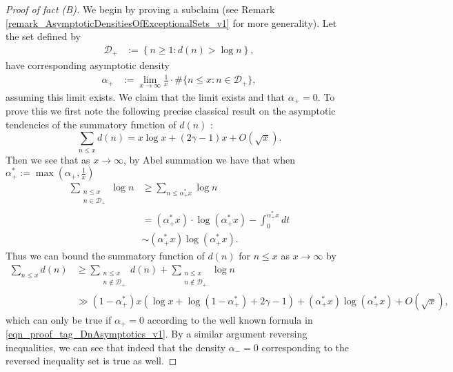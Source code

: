 \documentclass[11pt,reqno,a4letter]{article}
\numberwithin{figure}{section}
\numberwithin{table}{section}
\theoremstyle{plain}
\numberwithin{theorem}{section}
\theoremstyle{definition}
\begin{document}
\begin{proof}[Proof of fact (B)] 
We begin by proving a subclaim 
(see Remark \ref{remark_AsymptoticDensitiesOfExceptionalSets_v1} for more generality). 
Let the set defined by 
\begin{align*} 
\mathcal{D}_{+} & := \left\{n \geq 1: d(n) > \log n\right\}, 
\end{align*} 
have corresponding asymptotic density
\begin{align*} 
\alpha_{+} & := \lim_{x \rightarrow \infty} \frac{1}{x} \cdot \#\{n \leq x: n \in \mathcal{D}_{+}\}, 
\end{align*} 
assuming this limit exists. 
We claim that the limit exists and that $\alpha_{+} = 0$. To prove this we first note the following 
precise classical 
result on the asymptotic tendencies of the summatory function of $d(n)$ \cite[\S 27.11]{NISTHB}: 
\begin{equation} 
\label{eqn_proof_tag_DnAsymptotics_v1} 
\sum_{n \leq x} d(n) = x\log x + (2\gamma-1) x + O(\sqrt{x}). 
\end{equation} 
Then we see that as $x \rightarrow \infty$, by Abel summation we have that when 
$\alpha_{+}^{\ast} := \max\left(\alpha_{+}, \frac{1}{x}\right)$ 
\begin{align*} 
\sum_{\substack{n \leq x \\ n \in \mathcal{D}_{+}}} \log n & \geq \sum_{n \leq \alpha_{+}^{\ast} x} \log n \\ 
     & = (\alpha_{+}^{\ast} x) \cdot \log(\alpha_{+}^{\ast} x) - \int_0^{\alpha_{+}^{\ast} x} dt \\ 
     & \sim (\alpha_{+}^{\ast} x) \log(\alpha_{+}^{\ast} x). 
\end{align*} 
Thus we can bound the summatory function of $d(n)$ for $n \leq x$ as $x \rightarrow \infty$ by 
\begin{align*} 
\sum_{n \leq x} d(n) & \geq \sum_{\substack{n \leq x \\ n \notin \mathcal{D}_{+}}} d(n) + 
     \sum_{\substack{n \leq x \\ n \notin \mathcal{D}_{+}}} \log n \\ 
     & \gg (1-\alpha_{+}^{\ast}) x \left(\log x + \log(1- \alpha_{+}^{\ast}) + 2\gamma-1\right) + 
     (\alpha_{+}^{\ast} x) \log\left(\alpha_{+}^{\ast} x\right) + O(\sqrt{x}), 
\end{align*} 
which can only be true if $\alpha_{+} = 0$ according to the well known formula 
in \eqref{eqn_proof_tag_DnAsymptotics_v1}. 
By a similar argument reversing inequalities, we can see that indeed that the density 
$\alpha_{-} = 0$ corresponding to the reversed inequality set is true as well. 


\end{proof}
\end{document}
